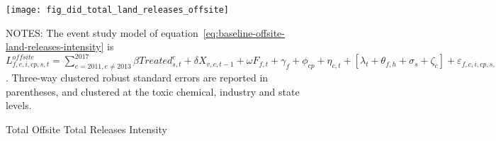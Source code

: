 \begin{figure}[H]
    \centering
    \texttt{[image: fig\_did\_total\_land\_releases\_offsite]}
    \caption{Total Offsite Total Releases Intensity}
    \label{fig:baseline-offsite-land-releases-intensity}
    \begin{minipage}{12cm}
        \vspace{0.05in}
        NOTES: The event study model of equation~\ref{eq:baseline-offsite-land-releases-intensity} is $L_{f,c,i,cp,s,t}^{offsite} = \sum_{{e = 2011},{e \neq 2013}}^{2017} \beta Treated_{s,t}^e + \delta X_{v,c,t-1} + \omega F_{f,t} + \gamma_{f} + \phi_{cp} + \eta_{c,t} + \left[\lambda_{t} + \theta_{f,h} + \sigma_{s} + \zeta_{c} \right] + \varepsilon_{f,c,i,cp,s,t}$. Three-way clustered robust standard errors are reported in parentheses, and clustered at the toxic chemical, industry and state levels.
    \end{minipage}
\end{figure}